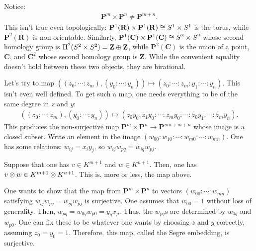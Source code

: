 \documentclass [11 pt, oneside] {article}
\begin{document}
Notice:
\begin{align*}
	\mathbf{P}^m \times \mathbf{P}^n\ne \mathbf{P}^{m+n}.
\end{align*}
This isn't true even topologically: $\mathbf{P}^1(\mathbf{R})\times \mathbf{P}^1(\mathbf{R})\cong S^1\times S^1$ is the torus, while $\mathbf{P}^2(\mathbf{R})$ is non-orientable. Similarly, $\mathbf{P}^1(\mathbf{C})\times \mathbf{P}^1(\mathbf{C})\cong S^2\times S^2$ whose second homology group is $\operatorname{H}^2(S^2\times S^2) =  \mathbf{Z}\oplus \mathbf{Z}$, while $\mathbf{P}^2(\mathbf{C})$ is the union of a point, $\mathbf{C}$, and $\mathbf{C}^2$ whose second homology group is $\mathbf{Z}$. While the convenient equality doesn't hold between these two objects, they are birational.

Let's try to map $((z_0:\cdots:z_m), (y_0:\cdots:y_n))\longmapsto (z_0:\cdots:z_m:y_1:\cdots:y_n)$. This isn't even well defined. To get such a map, one needs everything to be of the same degree in $z$ and $y$:
\begin{align*}
	((z_0:\cdots:z_m), (y_0:\cdots:y_n))\longmapsto (z_0y_0:z_1y_0:\cdots:z_my_0:\cdots: z_0y_1:\cdots:z_my_n).
\end{align*}
This produces the non-surjective map $\mathbf{P}^m\times \mathbf{P}^n\longrightarrow \mathbf{P}^{mn+m+n}$ whose image is a closed subset. Write an element in the image $(w_{00}:w_{10}:\cdots: w_{m0} : \cdots: w_{mn})$. One has some relations: $w_{ij} = x_iy_j$, so $w_{ij}w_{pq}=w_{iq}w_{pj}$. 

Suppose that one has $v\in K^{m+1}$ and $w\in K^{n+1}$. Then, one has $v\otimes w \in K^{m+1}\otimes K^{n+1}$. This is, more or less, the map above.

One wants to show that the map from $\mathbf{P}^m\times \mathbf{P}^n$ to vectors $(w_{00}:\cdots:w_{mn})$ satisfying $w_{ij}w_{pq}=w_{iq}w_{pj}$ is surjective. One assumes that $w_{00}=1$ without loss of generality. Then, $w_{pq} = w_{0q}w_{p0}=y_qx_p$. Thus, the $w_{pq}$s are determined by $ w_{0q}$ and $w_{p0}$. One can fix these to be whatever one wants by choosing $z$ and $y$ correctly, assuming $z_0=y_0=1$. Therefore, this map, called the Segre embedding, is surjective.
\end{document}
